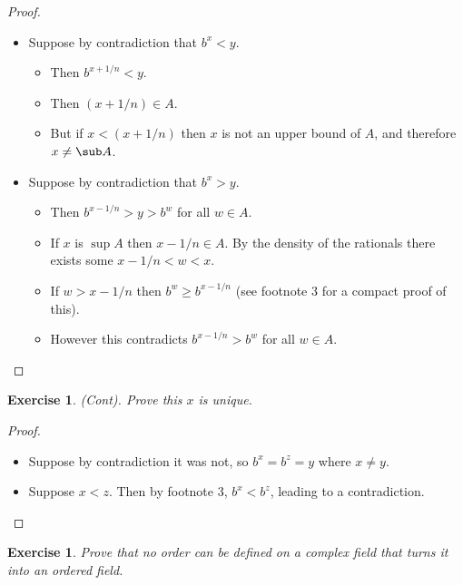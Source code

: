 \documentclass[12pt]{article}
\newtheorem{exercise}{Exercise}[section]
\newtheorem{subexercise}{Exercise}[exercise]
\begin{document}
\begin{proof}
    
    \begin{itemize}
        \item Suppose by contradiction that $b^x < y$.
        \begin{itemize}
            \item Then $b^{x+1/n} < y$.
            \item Then $(x + 1/n) \in A$.
            \item But if $x < (x+1/n)$ then $x$ is not an upper bound of $A$, and therefore $x \neq \sub A$.
        \end{itemize}
        \item Suppose by contradiction that $b^x > y$.
        \begin{itemize}
            \item Then $b^{x-1/n} > y > b^w$ for all $w \in A$.
            \item If $x$ is $\sup A$ then ${x-1/n} \in A$. By the density of the rationals there exists some ${x - 1/n} < w < x$.
            \item If $w > {x - 1/n}$ then $b^w \geq b^{x-1/n}$ (see footnote 3 for a compact proof of this).
            \item However this contradicts $b^{x-1/n} > b^w$ for all $w \in A$.
        \end{itemize}
    \end{itemize}
    
\end{proof}

\begin{subexercise}
    (Cont). Prove this $x$ is unique.
\end{subexercise}

\begin{proof}
    
    \begin{itemize}
        \item Suppose by contradiction it was not, so $b^x = b^z = y$ where $x \neq y$.
        \item Suppose $x < z$. Then by footnote 3, $b^x < b^z$, leading to a contradiction.
    \end{itemize}
    
\end{proof}

\begin{exercise}
    Prove that no order can be defined on a complex field that turns it into an ordered field.
\end{exercise}
\end{document}
